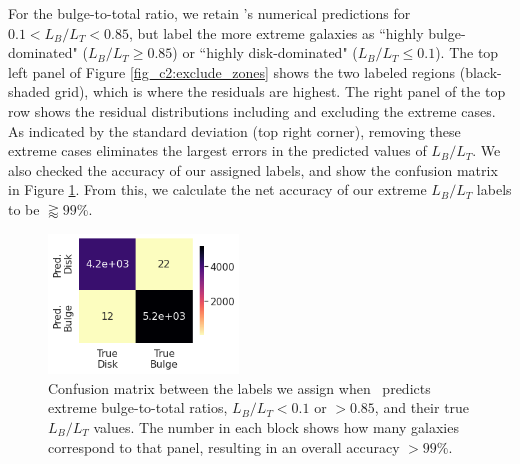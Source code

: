 For the bulge-to-total ratio, we retain \gampen's numerical predictions for $0.1 < L_B/L_T < 0.85$, but label the more extreme galaxies as ``highly bulge-dominated" ($L_B/L_T \geq 0.85$) or ``highly disk-dominated" ($L_B/L_T \leq 0.1$).
The top left panel of Figure \ref{fig_c2:exclude_zones} shows the two labeled regions (black-shaded grid), which is where the residuals are highest. 
The right panel of the top row shows the residual distributions including and excluding the extreme cases. As indicated by the standard deviation (top right corner), removing these extreme cases eliminates the largest errors in the predicted values of $L_B/L_T$. We also checked the accuracy of our assigned labels, and show the confusion matrix in Figure \ref{fig_c2:confusion_matrix}. From this, we calculate the net accuracy of our extreme $L_B/L_T$ labels to be $\gtrapprox99\%$. 

\begin{figure}[htb]
    \centering
    \includegraphics[width
    =0.45\textwidth]{confusion_matrix.png}
    \caption{Confusion matrix between the labels we assign when \gampen\ predicts extreme bulge-to-total ratios, $L_B/L_T <0.1$ or $>0.85$, and their true $L_B/L_T$ values. %
    The number in each block shows how many galaxies correspond to that panel, resulting in an overall accuracy $>99\%$.
    }
    \label{fig_c2:confusion_matrix}
\end{figure}

